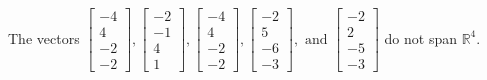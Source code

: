 \begin{exercise}
\begin{exerciseStatement}
  \end{exerciseStatement}
  \begin{exerciseAnswer}
   The vectors \(\left[\begin{array}{r}
-4 \\
4 \\
-2 \\
-2
\end{array}\right] , \left[\begin{array}{r}
-2 \\
-1 \\
4 \\
1
\end{array}\right] , \left[\begin{array}{r}
-4 \\
4 \\
-2 \\
-2
\end{array}\right] , \left[\begin{array}{r}
-2 \\
5 \\
-6 \\
-3
\end{array}\right] , \text{ and } \left[\begin{array}{r}
-2 \\
2 \\
-5 \\
-3
\end{array}\right]\) 
  	 do not  
	span \(\mathbb{R}^4\).
  


  \end{exerciseAnswer}
\end{exercise}